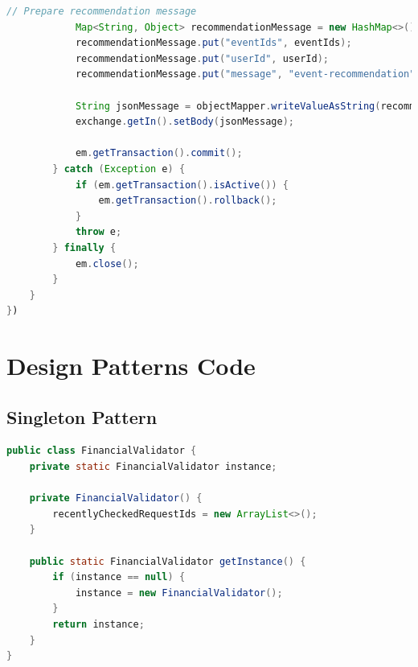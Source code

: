 \documentclass{article}
\begin{document}
\begin{enumerate}
\begin{lstlisting}[language=Java, caption={Content Enricher for Recommendation Engine}]
            // Prepare recommendation message
            Map<String, Object> recommendationMessage = new HashMap<>();
            recommendationMessage.put("eventIds", eventIds);
            recommendationMessage.put("userId", userId);
            recommendationMessage.put("message", "event-recommendation");

            String jsonMessage = objectMapper.writeValueAsString(recommendationMessage);
            exchange.getIn().setBody(jsonMessage);

            em.getTransaction().commit();
        } catch (Exception e) {
            if (em.getTransaction().isActive()) {
                em.getTransaction().rollback();
            }
            throw e;
        } finally {
            em.close();
        }
    }
})
\end{lstlisting}
\end{enumerate}

\FloatBarrier
\section{Design Patterns Code}

\subsection{Singleton Pattern}
\begin{lstlisting}[language=Java, caption={Singleton Pattern for Financial Validator}]
public class FinancialValidator {
    private static FinancialValidator instance;

    private FinancialValidator() {
        recentlyCheckedRequestIds = new ArrayList<>();
    }

    public static FinancialValidator getInstance() {
        if (instance == null) {
            instance = new FinancialValidator();
        }
        return instance;
    }
}
\end{lstlisting}
\end{document}
